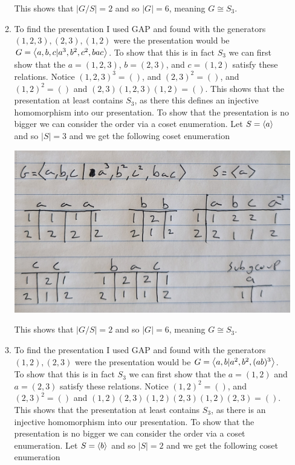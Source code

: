 \documentclass[12pt]{amsart}
\begin{document}
\begin{itemize}
\begin{enumerate}[label= (\alph*)]
   This shows that $|G/S|=2$ and so $|G|=6$, meaning $G\cong S_3$.

   \item To find the presentation I used GAP and found with the generators $(1,2,3), (2,3), (1,2)$
   were the presentation would be $G=\left\langle a,b,c|a^3,b^2,c^2,bac \right\rangle$. 
   To show that this is in fact $S_3$ we can first show 
   that the $a=(1,2,3)$, $b=(2,3)$, and $c=(1,2)$ satisfy these relations. %
   Notice $(1,2,3)^3=()$, and $(2,3)^2=()$, and $(1,2)^2=()$ and $(2,3)(1,2,3)(1,2)=()$. 
   This shows that the presentation at least contains $S_3$, as 
   there this defines an injective homomorphism into our presentation. 
   To show that the presentation is no bigger we can consider the order via a coset enumeration.
   Let $S=\left\langle a \right\rangle$ and so $|S|=3$ and we get the following coset enumeration

   \includegraphics[scale=.15]{676partb.jpg}

   This shows that $|G/S|=2$ and so $|G|=6$, meaning $G\cong S_3$.

   \item To find the presentation I used GAP and found with the generators $(1,2), (2,3)$
   were the presentation would be $G=\left\langle a,b|a^2,b^2,(ab)^3 \right\rangle$. 
   To show that this is in fact $S_3$ we can first show 
   that the $a=(1,2)$ and $a=(2,3)$ satisfy these relations. %
   Notice $(1,2)^2=()$, and $(2,3)^2=()$ and $(1,2)(2,3)(1,2)(2,3)(1,2)(2,3)=()$. 
   This shows that the presentation at least contains $S_3$, as 
   there is an injective homomorphism into our presentation. 
   To show that the presentation is no bigger we can consider the order via a coset enumeration.
   Let $S=\left\langle b \right\rangle$ and so $|S|=2$ and we get the following coset enumeration


\end{enumerate}
\end{itemize}
\end{document}

